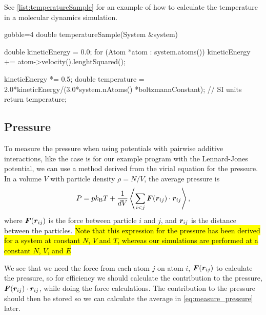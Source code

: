 See \cref{list:temperatureSample} for an example of how to calculate the temperature in a molecular dynamics simulation.
%
\begin{listing}[!htb]%
\begin{cppcode*}{gobble=4}
    double temperatureSample(System &system)
    {
        double kineticEnergy = 0.0;
        for (Atom *atom : system.atoms())
        {
            kineticEnergy += atom->velocity().lenghtSquared();
        }

        kineticEnergy *= 0.5;
        double temperature = 2.0*kineticEnergy/(3.0*system.nAtoms()
                                                *boltzmannConstant);  // SI units
        return temperature;
    }
\end{cppcode*}
\caption{%
    An example of how to calculate the temperature in a molecular dynamics simulation. Example implementation of \texttt{temperatureSample} from \cref{list:sampling}.%
    \label{list:temperatureSample}%
}%
\end{listing}%


\subsection{Pressure\label{subsec:pressure}}
To measure the pressure when using potentials with pairwise additive interactions, like the case is for our example program with the Lennard-Jones potential, we can use a method derived from the virial equation for the pressure\cite[Section~4.4]{frenkel2001understanding}. In a volume $V$ with particle density $\rho = N/V$, the average pressure is
\begin{align}
    P = pk_\text{B}T + \frac{1}{dV} \Braket{\sum_{i<j} \boldsymbol{F} (\boldsymbol{r}_{ij}) \cdot \boldsymbol{r}_{ij}},
    \label{eq:measure_pressure}
\end{align}
where $\boldsymbol{F}(\boldsymbol{r}_{ij})$ is the force between particle $i$ and $j$, and $\boldsymbol{r}_{ij}$ is the distance between the particles. \hl{Note that this expression for the pressure has been derived for a system at constant $N$, $V$ and $T$, whereas our simulations are performed at a constant $N$, $V$, and $E$}

We see that we need the force from each atom $j$ on atom $i$, $\boldsymbol{F}(\boldsymbol{r}_{ij})$ to calculate the pressure, so for efficiency we should calculate the contribution to the pressure, $\boldsymbol{F}(\boldsymbol{r}_{ij})\cdot\boldsymbol{r}_{ij}$, while doing the force calculations. The contribution to the pressure should then be stored so we can calculate the average in \cref{eq:measure_pressure} later.

